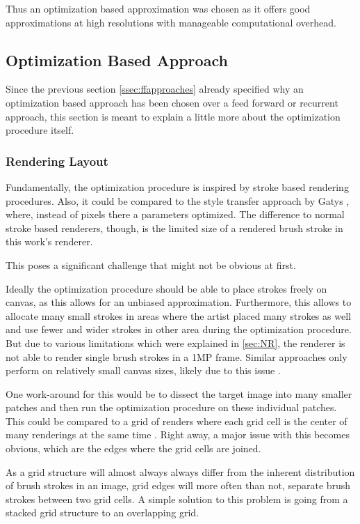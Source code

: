 Thus an optimization based approximation was chosen as it offers good approximations
at high resolutions with manageable computational overhead.

\subsection{Optimization Based Approach}
Since the previous section \ref{ssec:ffapproaches} already specified why an optimization
based approach has been chosen over a feed forward or recurrent approach, this section
is meant to explain a little more about the optimization procedure itself.


\subsubsection{Rendering Layout}
Fundamentally, the optimization procedure is inspired by stroke based rendering procedures.
Also, it could be compared to the style transfer approach by Gatys \etal \cite{gatys}, where, 
instead of pixels there a parameters optimized.
The difference to normal stroke based renderers, though, is the limited size of a
rendered brush stroke in this work's renderer.

This poses a significant challenge that might not be obvious at first.

Ideally the optimization procedure should be able to place strokes freely on canvas,
as this allows for an unbiased approximation.
Furthermore, this allows to allocate many small strokes in areas where the artist
placed many strokes as well and use fewer and wider strokes in other area during
the optimization procedure.
But due to various limitations which were explained in \ref{sec:NR}, the renderer
is not able to render single brush strokes in a 1MP frame.
Similar approaches only perform on relatively small canvas sizes, likely due to this
issue .

One work-around for this would be to dissect the target image into many smaller
patches and then run the optimization procedure on these individual patches.
This could be compared to a grid of renders where each grid cell is the center of
many renderings at the same time .
Right away, a major issue with this becomes obvious, which are the edges where the
grid cells are joined.

As a grid structure will almost always always differ from the inherent distribution
of brush strokes in an image, grid edges will more often than not, separate brush
strokes between two grid cells.
A simple solution to this problem is going from a stacked grid structure to an overlapping
grid. 

